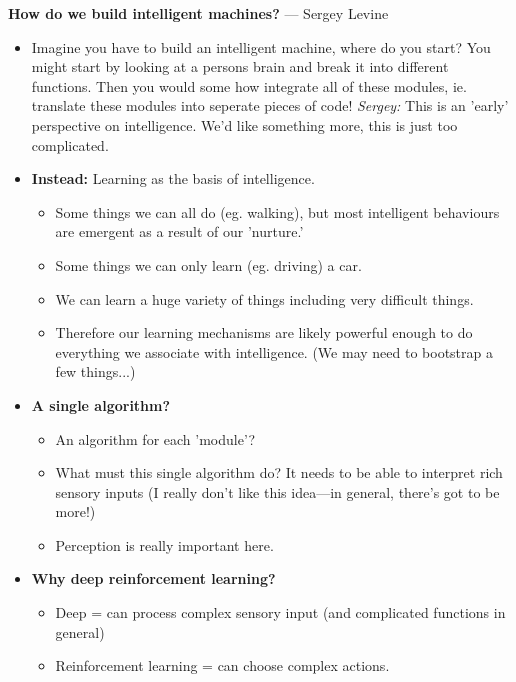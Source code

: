 \documentclass[11pt]{amsart}
\theoremstyle{definition}
\numberwithin{theorem}{section}
\numberwithin{definition}{section}
\numberwithin{equation}{section}
\begin{document}
\textbf{How do we build intelligent machines?} --- Sergey Levine
\begin{itemize}
	\item Imagine you have to build an intelligent machine, where do you start? You might start by looking at a persons brain and break it into different functions. Then you would some how integrate all of these modules, ie. translate these modules into seperate pieces of code! \emph{Sergey:} This is an 'early' perspective on intelligence. We'd like something more, this is just too complicated.
	\item \textbf{Instead: } Learning as the basis of intelligence.
	\begin{itemize}
		\item Some things we can all do (eg. walking), but most intelligent behaviours are emergent as a result of our 'nurture.'
		\item Some things we can only learn (eg. driving) a car.
		\item We can learn a huge variety of things including very difficult things.
		\item Therefore our learning mechanisms are likely powerful enough to do everything we associate with intelligence. (We may need to bootstrap a few things...)
	\end{itemize}
	\item \textbf{A single algorithm?}
	\begin{itemize}
		\item An algorithm for each 'module'? 
		\item What must this single algorithm do? It needs to be able to interpret rich sensory inputs (I really don't like this idea---in general, there's got to be more!)
		\item Perception is really important here.
	\end{itemize}
	\item \textbf{Why deep reinforcement learning?}
	\begin{itemize}
		\item Deep = can process complex sensory input (and complicated functions in general)
		\item Reinforcement learning = can choose complex actions.
	\end{itemize}
\end{itemize}
\end{document}
